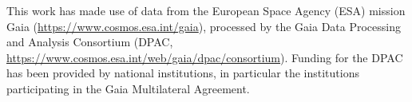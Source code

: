 This work has made use of data from the European Space Agency (ESA) mission
Gaia (\url{https://www.cosmos.esa.int/gaia}), processed by the Gaia Data Processing and Analysis Consortium (DPAC,
\url{https://www.cosmos.esa.int/web/gaia/dpac/consortium}). Funding for the DPAC
has been provided by national institutions, in particular the institutions
participating in the Gaia Multilateral Agreement.